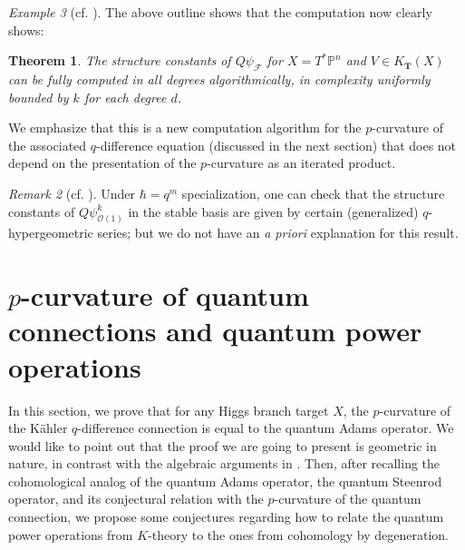 \documentclass[reqno]{amsart}
\numberwithin{equation}{section}
\numberwithin{equation}{section}
\numberwithin{equation}{section}
\newtheorem{thm}{Theorem}[section]
\theoremstyle{definition}
\theoremstyle{remark}
\theoremstyle{remark}
\newtheorem{rem}[thm]{Remark}
\newtheorem{example}[thm]{Example}
\begin{document}
\begin{example}[{cf. \cite[Section 6.3]{Lee23a}}]
    
    The above outline shows that the computation now clearly shows:

    \begin{thm}
        The structure constants of $Q\psi_{\mathcal{F}}$ for $X = T^*\mathbb{P}^{n}$ and $V \in K_\mathbf{T}(X)$ can be fully computed in all degrees algorithmically, in complexity uniformly bounded by $k$ for each degree $d$.
    \end{thm}
    We emphasize that this is a new computation algorithm for the $p$-curvature of the associated $q$-difference equation (discussed in the next section) that does not depend on the presentation of the $p$-curvature as an iterated product.

    \begin{rem}[{cf. \cite[Remark 7.5]{Lee23a}}]
        Under $\hbar=q^m$ specialization, one can check that the structure constants of $Q\psi^k_{\mathcal{O}(1)}$ in the stable basis are given by certain (generalized) $q$-hypergeometric series; but we do not have an \emph{a priori} explanation for this result.
    \end{rem}    
\end{example}


\section{$p$-curvature of quantum connections and quantum power operations}\label{sec:pcurvature}

In this section, we prove that for any Higgs branch target $X$, the $p$-curvature of the K\"ahler $q$-difference connection is equal to the quantum Adams operator. We would like to point out that the proof we are going to present is geometric in nature, in contrast with the algebraic arguments in \cite{Lee23b, chen2024exponential}. Then, after recalling the cohomological analog of the quantum Adams operator, the quantum Steenrod operator, and its conjectural relation with the $p$-curvature of the quantum connection, we propose some conjectures regarding how to relate the quantum power operations from $K$-theory to the ones from cohomology by degeneration.
\end{document}
